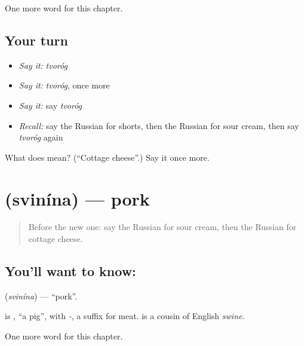 \begin{grammarlens}[title={What you've built}]
One more word for this chapter.
\end{grammarlens}

\subsection*{Your turn}
\begin{itemize}
\raggedright
  \item \emph{Say it:} \emph{tvoróg}
  \item \emph{Say it:} \emph{tvoróg}, once more
  \item \emph{Say it:} say \emph{tvoróg}
  \item \emph{Recall:} say the Russian for shorts, then the Russian for sour cream, then say \emph{tvoróg} again
\end{itemize}

\begin{tcolorbox}[breakable,colback=teal!4,colframe=teal!35!black,title={Before you move on}]
What does  mean? (\textquotedblleft{}Cottage cheese\textquotedblright{}.) Say it once more.
\end{tcolorbox}
\section[\texorpdfstring{\ru{свинина} (svinína)}{свинина (svinína)}]{ (svinína) — pork}

\label{lesson:RU-C249-svinina}



\begin{quote}
Before the new one: say the Russian for sour cream, then the Russian for cottage cheese.
\end{quote}

\subsection*{You'll want to know: }
\textbf{} (\emph{svinína}) — \textquotedblleft{}pork\textquotedblright{}.

\begin{cousinweb}
\textbf{} is \emph{}, \textquotedblleft{}a pig\textquotedblright{}, with \emph{-}, a suffix for meat. \emph{} is a cousin of English \emph{swine}.
\end{cousinweb}

\begin{grammarlens}[title={What you've built}]
One more word for this chapter.
\end{grammarlens}

